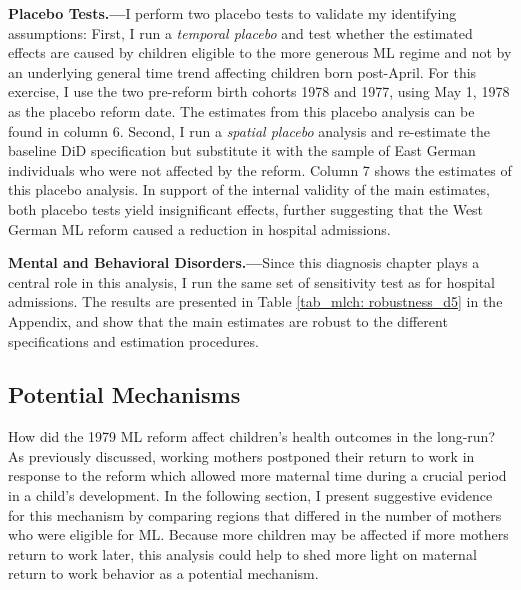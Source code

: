 \textbf{Placebo Tests.---}I perform two placebo tests to validate my identifying assumptions: First, I run a \textit{temporal placebo} and test whether the estimated effects are caused by children eligible to the more generous ML regime and not by an underlying general time trend affecting children born post-April. For this exercise, I use the two pre-reform birth cohorts 1978 and 1977, using May 1, 1978 as the placebo reform date. The estimates from this placebo analysis can be found in column 6. Second, I run a \textit{spatial placebo} analysis and re-estimate the baseline DiD specification but substitute it with the sample of East German individuals who were not affected by the reform. Column 7 shows the estimates of this placebo analysis. In support of the internal validity of the main estimates, both placebo tests yield insignificant effects, 
further suggesting that the West German ML reform caused a reduction in hospital admissions.\newline


\textbf{Mental and Behavioral Disorders.---}Since this diagnosis chapter plays a central role in this analysis, I run the same set of sensitivity test as for hospital admissions. The results are presented in Table \ref{tab_mlch: robustness_d5} in the Appendix, and show that the main estimates are robust to the different specifications and estimation procedures.




\bigskip
{}
\subsection{Potential Mechanisms}
How did the 1979 ML reform affect children's health outcomes in the long-run? As previously discussed, working mothers postponed their return to work in response to the reform \citep{Dustmann2012,schonberg2014expansions} which allowed more maternal time during a crucial period in a child's development. In the following section, I present suggestive evidence for this mechanism by comparing regions that differed in the number of mothers who were eligible for ML. Because more children may be affected if more mothers return to work later, this analysis could help to shed more light on maternal return to work behavior as a potential mechanism.

